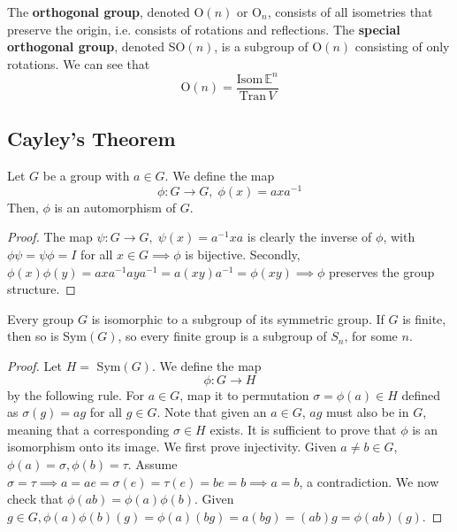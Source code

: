     \begin{definition}
      The \textbf{orthogonal group}, denoted O$(n)$ or O$_{n}$, consists of all isometries that preserve the origin, i.e. consists of rotations and reflections. The \textbf{special orthogonal group}, denoted SO$(n)$, is a subgroup of O$(n)$ consisting of only rotations. We can see that 
      \begin{equation}
        \text{O}(n)=\frac{\text{Isom}\, \mathbb{E}^{n}}{\text{Tran}\,V}
      \end{equation}
    \end{definition}

\subsection{Cayley's Theorem}

  \begin{lemma}
    Let $G$ be a group with $a \in G$. We define the map
    \begin{equation}
      \phi: G \longrightarrow G, \; \phi (x) = a x a^{-1}
    \end{equation}
    Then, $\phi$ is an automorphism of $G$. 
  \end{lemma}
  \begin{proof}
    The map $\psi: G \longrightarrow G, \; \psi(x) = a^{-1} x a$ is clearly the inverse of $\phi$, with $\phi \psi = \psi \phi = I$ for all $x \in G \implies \phi$ is bijective. Secondly, $\phi(x) \phi(y) = a x a^{-1} a y a^{-1} = a (x y) a ^{-1} = \phi (x y) \implies \phi$ preserves the group structure. 
  \end{proof}

  \begin{theorem}
    Every group $G$ is isomorphic to a subgroup of its symmetric group. If $G$ is finite, then so is Sym$(G)$, so every finite group is a subgroup of $S_{n}$, for some $n$.
  \end{theorem}
  \begin{proof}
    Let $H =$ Sym$(G)$. We define the map
    \begin{equation}
      \phi: G \longrightarrow H
    \end{equation}
    by the following rule. For $a \in G$, map it to permutation $\sigma = \phi (a) \in H$ defined as $\sigma(g) = a g$ for all $g \in G$. Note that given an $a \in G$, $a g$ must also be in $G$, meaning that a corresponding $\sigma \in H$ exists. It is sufficient to prove that $\phi$ is an isomorphism onto its image. We first prove injectivity. Given $a \neq b \in G$, $\phi(a)=\sigma, \phi(b) = \tau$. Assume $\sigma = \tau \implies a = a e =  \sigma(e) = \tau (e) = b e = b \implies a = b$, a contradiction. We now check that $\phi(a b) = \phi(a) \phi(b)$. Given $g \in G, \phi(a) \phi(b) (g) = \phi(a) (bg) = a(bg)= (ab) g = \phi(ab) (g).$
  \end{proof}

